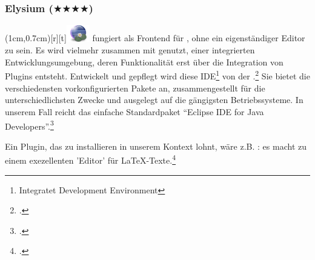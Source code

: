 %
%
%



\subsubsection{Elysium ($\bigstar\bigstar\bigstar\bigstar$)}

\parpic(1cm,0.7cm)[r][t]{\includegraphics[width=1cm]{logos/elysium-300dpi.png}}
\label{Elysium} fungiert als Frontend für , ohne ein
eigenständiger Editor zu sein. Es wird vielmehr zusammen mit 
genutzt, einer integrierten Entwicklungsumgebung, deren Funktionalität erst über
die Integration von Plugins entsteht. Entwickelt und gepflegt wird diese
IDE\footnote{Integratet Development Environment} von der .\footcite[vgl.][\nopage wp]{Eclipse2018a} Sie bietet die
verschiedensten vorkonfigurierten Pakete an, zusammengestellt für die
unterschiedlichsten Zwecke und ausgelegt auf die gängigsten Betriebssysteme. In
unserem Fall reicht das einfache Standardpaket \enquote{Eclipse IDE for Java
Developers}.\footcite[vgl.][\nopage wp]{Eclipse2018b}

Ein Plugin, das zu installieren in unserem Kontext lohnt, wäre z.B.
: es macht  zu einem exezellenten 'Editor' für
\LaTeX-Texte.\footcite[vgl.][\nopage wp]{TeXlipse2019a}

